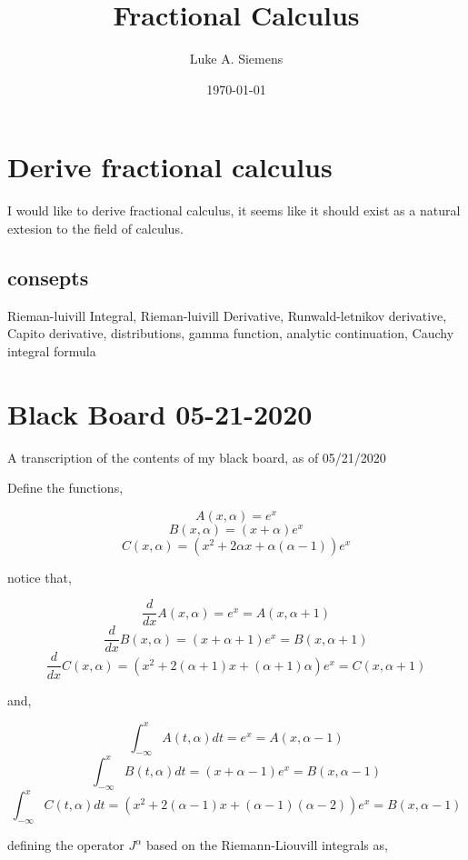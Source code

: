 \documentclass[%
 preprint,
 amsmath, amssymb, aps, pra, 10pt
]{revtex4-2}
\begin{document}
\title{Fractional Calculus}%

\author{Luke A. Siemens}
\noaffiliation

\date{\today}

\maketitle


\section{Derive fractional calculus}
I would like to derive fractional calculus, it seems like it should exist as a natural extesion to the field of calculus.

\subsection{consepts}
Rieman-luivill Integral, Rieman-luivill Derivative, Runwald-letnikov derivative, Capito derivative, distributions, gamma function, analytic continuation, Cauchy integral formula

\section{Black Board 05-21-2020}

A transcription of the contents of my black board, as of 05/21/2020

Define the functions,

\[A(x, \alpha) = e^x\]
\[B(x, \alpha) = \left(x + \alpha \right)e^x\]
\[C(x, \alpha) = \left(x^2 + 2\alpha x + \alpha (\alpha - 1) \right)e^x\]

notice that,

\[\frac{d}{dx} A(x, \alpha) = e^x = A(x, \alpha + 1)\]
\[\frac{d}{dx} B(x, \alpha) = \left(x + \alpha + 1 \right)e^x = B(x, \alpha + 1)\]
\[\frac{d}{dx} C(x, \alpha) = \left(x^2 + 2(\alpha + 1) x + (\alpha + 1)\alpha \right)e^x = C(x, \alpha + 1)\]

and,

\[\int_{-\infty}^xA(t, \alpha)dt = e^x = A(x, \alpha - 1)\]
\[\int_{-\infty}^xB(t, \alpha)dt = \left(x + \alpha - 1 \right)e^x = B(x, \alpha - 1)\]
\[\int_{-\infty}^xC(t, \alpha)dt = \left(x^2 + 2(\alpha - 1) x + (\alpha - 1)(\alpha - 2)\right)e^x = B(x, \alpha - 1)\]

defining the operator $J^\alpha$ based on the Riemann-Liouvill integrals as,
\end{document}
